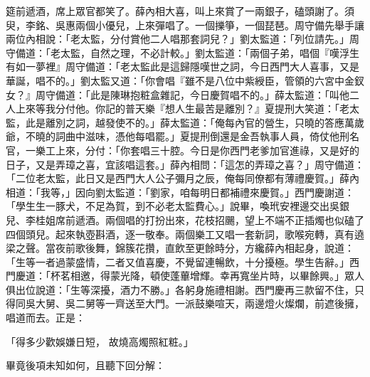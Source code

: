\begin{showcontents}{}
筵前遞酒，席上眾官都笑了。薛內相大喜，叫上來賞了一兩銀子，磕頭謝了。須臾，李銘、吳惠兩個小優兒，上來彈唱了。一個擽箏，一個琵琶。周守備先舉手讓兩位內相說：「老太監，分付賞他二人唱那套詞兒？」劉太監道：「列位請先。」周守備道：「老太監，自然之理，不必計較。」劉太監道：「兩個子弟，唱個『嘆浮生有如一夢裡』周守備道：「老太監此是這歸隱嘆世之詞，今日西門大人喜事，又是華誕，唱不的。」劉太監又道：「你會唱『雖不是八位中紫綬臣，管領的六宮中金釵女？』周守備道：「此是陳琳抱粧盒雜記，今日慶賀唱不的。」薛太監道：「叫他二人上來等我分付他。你記的普天樂『想人生最苦是離別？』夏提刑大笑道：「老太監，此是離別之詞，越發使不的。」薛太監道：「俺每內官的營生，只曉的答應萬歲爺，不曉的詞曲中滋味，憑他每唱罷。」夏提刑倒還是金吾執事人員，倚仗他刑名官，一樂工上來，分付：「你套唱三十腔。今日是你西門老爹加官進祿，又是好的日子，又是弄璋之喜，宜該唱這套。」薛內相問：「這怎的弄璋之喜？」周守備道：「二位老太監，此日又是西門大人公子彌月之辰，俺每同僚都有薄禮慶賀。」薛內相道：「我等，」因向劉太監道：「劉家，咱每明日都補禮來慶賀。」西門慶謝道：「學生生一豚犬，不足為賀，到不必老太監費心。」說畢，喚玳安裡邊交出吳銀兒、李桂姐席前遞酒。兩個唱的打扮出來，花枝招颺，望上不端不正插燭也似磕了四個頭兒。起來執壺斟酒，逐一敬奉。兩個樂工又唱一套新詞，歌喉宛轉，真有遶梁之聲。當夜前歌後舞，錦簇花攢，直飲至更餘時分，方纔薛內相起身，說道：「生等一者過蒙盛情，二者又值喜慶，不覺留連暢飲，十分擾極。學生告辭。」西門慶道：「杯茗相邀，得蒙光降，頓使蓬蓽增輝。幸再寬坐片時，以畢餘興。」眾人俱出位說道：「生等深擾，酒力不勝。」各躬身施禮相謝。西門慶再三款留不住，只得同吳大舅、吳二舅等一齊送至大門。一派鼓樂喧天，兩邊燈火燦爛，前遮後擁，唱道而去。正是：

「得多少歡娛嫌日短，  故燒高燭照紅粧。」

畢竟後項未知如何，且聽下回分解：





\end{showcontents}


